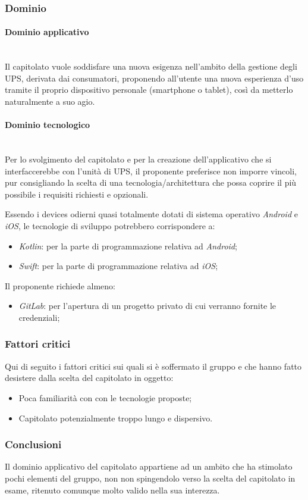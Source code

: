 \documentclass[11pt]{article}
\begin{document}
    \subsubsection{Dominio}
        \paragraph{Dominio applicativo}~\\
        
        \noindent
        Il capitolato vuole soddisfare una nuova esigenza nell'ambito della gestione degli UPS, derivata dai consumatori, proponendo
        all'utente una nuova esperienza d'uso tramite il proprio dispositivo personale (smartphone o tablet), così da metterlo naturalmente
        a suo agio.
        
        \paragraph{Dominio tecnologico}~\\
        
        \noindent
        Per lo svolgimento del capitolato e per la creazione dell'applicativo che si interfaccerebbe con l'unità di UPS, il proponente
        preferisce non imporre vincoli, pur consigliando la scelta di una tecnologia/architettura che possa coprire il più possibile i
        requisiti richiesti e opzionali.
        
        Essendo i devices odierni quasi totalmente dotati di sistema operativo \textit{Android} e \textit{iOS}, le tecnologie di sviluppo
        potrebbero corrispondere a:
        \begin{itemize}
            \item \textit{Kotlin}: per la parte di programmazione relativa ad \textit{Android};
            \item \textit{Swift}: per la parte di programmazione relativa ad \textit{iOS};
        \end{itemize}
        
        Il proponente richiede almeno:
        \begin{itemize}
        	\item \textit{GitLab}: per l'apertura di un progetto privato di cui verranno fornite le credenziali;
        \end{itemize}
    
    \subsubsection{Fattori critici}
    Qui di seguito i fattori critici sui quali si è soffermato il gruppo e che hanno fatto desistere dalla scelta del capitolato in
    oggetto:
    \begin{itemize}
            \item Poca familiarità con con le tecnologie proposte;
            \item Capitolato potenzialmente troppo lungo e dispersivo.
        \end{itemize}

    \subsubsection{Conclusioni}
    Il dominio applicativo del capitolato appartiene ad un ambito che ha stimolato pochi elementi del gruppo, non non spingendolo
    verso la scelta del capitolato in esame, ritenuto comunque molto valido nella sua interezza.
\end{document}
